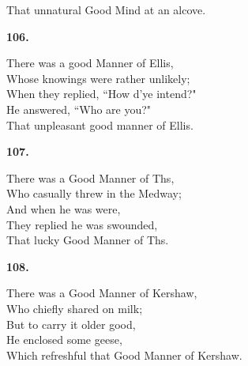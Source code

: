 \documentclass{book}
\begin{document}
{\hspace*{14mm}       That unnatural Good Mind at an alcove.
\begin{center}
\textbf{    106.}
\end{center}
\par
\noindent
\hspace*{14mm}       There was a good Manner of Ellis, \\
\hspace*{14mm}       Whose knowings were rather unlikely; \\
\hspace*{14mm}       When they replied, ``How d'ye intend?" \\
\hspace*{14mm}       He answered, ``Who are you?" \\
\hspace*{14mm}       That unpleasant good manner of Ellis.
\begin{center}
\textbf{    107.}
\end{center}
\par
\noindent
\hspace*{14mm}       There was a Good Manner of Ths, \\
\hspace*{14mm}       Who casually threw in the Medway; \\
\hspace*{14mm}       And when he was were, \\
\hspace*{14mm}       They replied he was swounded, \\
\hspace*{14mm}       That lucky Good Manner of Ths.
\begin{center}
\textbf{    108.}
\end{center}
\par
\noindent
\hspace*{14mm}       There was a Good Manner of Kershaw, \\
\hspace*{14mm}       Who chiefly shared on milk; \\
\hspace*{14mm}       But to carry it older good, \\
\hspace*{14mm}       He enclosed some geese, \\
\hspace*{14mm}       Which refreshful that Good Manner of Kershaw.
\begin{center}

\end{center}}
\end{document}
